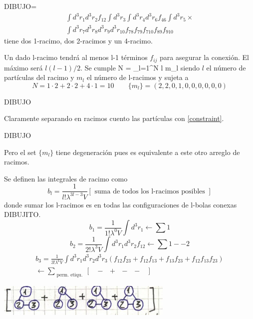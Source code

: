 \documentclass[10pt,oneside]{CBFT_book}
\begin{document}
DIBUJO=
\begin{multline*}
	\int d^3r_1 d^3r_2 f_{12} \int d^3r_3  \int d^3r_4 d^3r_6 f_{46} \int d^3r_5 \times  \\
	\int d^3r_7 d^3r_8 d^3r_9 d^3r_{10} f_{78} f_{79} f_{710} f_{89} f_{910} 
\end{multline*}
tiene dos 1-racimo, dos 2-racimos y un 4-racimo.

Un dado l-racimo tendrá al menos l-1 términos $f_{ij}$ para asegurar la conexión. El máximo será $l(l-1)/2$.
Se cumple 
\be
	N = \sum_{l=1}^N  \; l \cdot m_l \quad {}
	\label{constraint}
\ee
siendo $l$ el número de partículas del racimo y $m_l$ el número de l-racimos y sujeta a
\[
	N = 1 \cdot 2 + 2 \cdot 2 + 4 \cdot 1 = 10 \qquad  \{ m_l \} = ( 2,2,0,1,0,0,0,0,0,0 )
\]

DIBUJO 

Claramente separando en racimos cuento las partículas con \eqref{constraint}.

DIBUJO 

Pero el set $ \{ m_l \} $ tiene degeneración pues es equivalente a este otro arreglo de racimos.

Se definen las integrales de racimo como 
\[
	b_l = \frac{1}{l! \lambda^{3l-3} V} \left[ \text{ suma de todos los l-racimos posibles }\right]
\]
donde sumar los l-racimos es en todas las configuraciones de l-bolas conexas DIBUJITO.
\[
	b_1 = \frac{1}{1! \lambda^0 V} \int d^3r_1 \leftarrow \sum \boxed{1} 
\]
\[
	b_2 = \frac{1}{2! \lambda^3 V} \int d^3r_1 d^3r_2  f_{12} \leftarrow \sum \boxed{1} -- \boxed{2}
\]
\begin{multline*}
	b_3 = \frac{1}{3! \lambda^6 V} \int d^3r_1 d^3r_2 d^3r_3 (f_{12}f_{23} + f_{12}f_{13} + f_{13}f_{23}+
	f_{12}f_{13}f_{23} ) \\
	\leftarrow \sum_{\text{ perm. etiqu. }} \left[ \; \boxed{\phantom{a}}-\boxed{\phantom{a}} + 
	\boxed{\phantom{a}}-\boxed{\phantom{a}}-\boxed{\phantom{a}} \; \right]
\end{multline*}

\includegraphics[scale=0.4]{images/1606337083.jpg}
\end{document}
